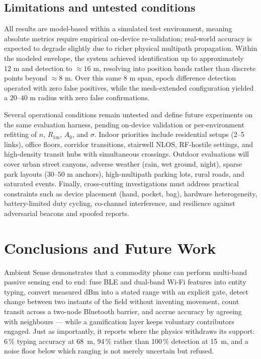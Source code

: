 \documentclass[journal,10pt]{IEEEtran}
\begin{document}
\subsection{Limitations and untested conditions}
All results are model-based within a simulated test environment, meaning absolute metrics require empirical on-device re-validation; real-world accuracy is expected to degrade slightly due to richer physical multipath propagation. Within the modeled envelope, the system achieved identification up to approximately $12\text{ m}$ and detection to $\approx 16\text{ m}$, resolving into position bands rather than discrete points beyond $\approx 8\text{ m}$. Over this same $8\text{ m}$ span, epoch difference detection operated with zero false positives, while the mesh-extended configuration yielded a $20\text{--}40\text{ m}$ radius with zero false confirmations.

Several operational conditions remain untested and define future experiments on the same evaluation harness, pending on-device validation or per-environment refitting of $n$, $R_{1\text{m}}$, $A_0$, and $\sigma$. Indoor priorities include residential setups (2--5 links), office floors, corridor transitions, stairwell NLOS, RF-hostile settings, and high-density transit hubs with simultaneous crossings. Outdoor evaluations will cover urban street canyons, adverse weather (rain, wet ground, night), sparse park layouts ($30\text{--}50\text{ m}$ anchors), high-multipath parking lots, rural roads, and saturated events. Finally, cross-cutting investigations must address practical constraints such as device placement (hand, pocket, bag), hardware heterogeneity, battery-limited duty cycling, co-channel interference, and resilience against adversarial beacons and spoofed reports.

\section{Conclusions and Future Work}
Ambient Sense demonstrates that a commodity phone can perform multi-band passive
sensing end to end: fuse BLE and dual-band Wi-Fi features into entity typing,
convert measured dBm into a stated range with an explicit gate, detect change
between two instants of the field without inventing movement, count transit
across a two-node Bluetooth barrier, and accrue accuracy by agreeing with
neighbours --- while a gamification layer keeps voluntary contributors engaged.
Just as importantly, it reports where the physics withdraws its support: 6\,\%
typing accuracy at 68~m, 94\,\% rather than 100\,\% detection at 15~m, and a
noise floor below which ranging is not merely uncertain but refused.
\end{document}
